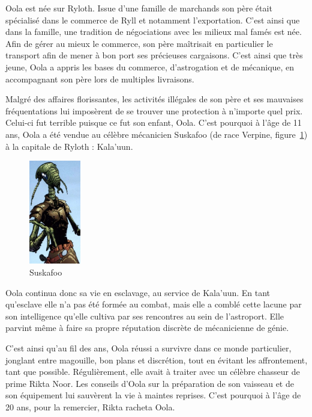 \documentclass[a4paper,9pt,twoside,twocolumn,openany]{book}
\begin{document}
Oola est née sur Ryloth. Issue d’une famille de marchands son père était spécialisé dans le commerce de Ryll et notamment l’exportation.
C’est ainsi que dans la famille, une tradition de négociations avec les milieux mal famés est née. Afin de gérer au mieux le commerce, son père maîtrisait en particulier le transport afin de mener à bon port ses précieuses cargaisons.
C’est ainsi que très jeune, Oola a appris les bases du commerce, d’astrogation et de mécanique, en accompagnant son père lors de multiples livraisons.

Malgré des affaires florissantes, les activités illégales de son père et ses mauvaises fréquentations lui imposèrent de se trouver une protection à n’importe quel prix. Celui-ci fut terrible puisque ce fut son enfant, Oola. C’est pourquoi à l’âge de 11 ans, Oola a été vendue au célèbre mécanicien Suskafoo (de race Verpine, figure~\ref{suskafoo}) à la capitale de Ryloth : Kala'uun.


\begin{figure}
    \includegraphics[width=0.2\textwidth]{img/verpine.jpg}
    \caption{Suskafoo}
    \label{suskafoo}
\end{figure}

Oola continua donc sa vie en esclavage, au service de Kala’uun. En tant qu’esclave elle n’a pas été formée au combat, mais elle a comblé cette lacune par son intelligence qu’elle cultiva par ses rencontres au sein de l’astroport. Elle parvint même à faire sa propre réputation discrète de mécanicienne de génie.

C’est ainsi qu’au fil des ans, Oola réussi a survivre dans ce monde particulier, jonglant entre magouille, bon plans et discrétion, tout en évitant les affrontement, tant que possible. Régulièrement, elle avait à traiter avec un célèbre chasseur de prime Rikta Noor. Les conseils d’Oola sur la préparation de son vaisseau et de son équipement lui sauvèrent la vie à maintes reprises. C’est pourquoi à l’âge de 20 ans, pour la remercier, Rikta racheta Oola.
\end{document}

